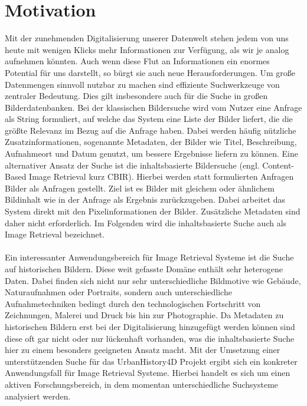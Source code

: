 \section*{Motivation}
Mit der zunehmenden Digitalisierung unserer Datenwelt stehen jedem von uns heute mit wenigen Klicks mehr Informationen zur Verfügung, als wir je analog aufnehmen könnten. Auch wenn diese Flut an Informationen ein enormes Potential für uns darstellt, so bürgt sie auch neue Herausforderungen. Um große Datenmengen sinnvoll nutzbar zu machen sind effiziente Suchwerkzeuge von zentraler Bedeutung. Dies gilt insbesondere auch für die Suche in großen Bilderdatenbanken. Bei der klassischen Bildersuche wird vom Nutzer eine Anfrage als String formuliert, auf welche das System eine Liste der Bilder liefert, die die größte Relevanz im Bezug auf die Anfrage haben. Dabei werden häufig nützliche  Zusatzinformationen, sogenannte Metadaten, der Bilder wie Titel, Beschreibung, Aufnahmeort und Datum genutzt, um bessere Ergebnisse liefern zu können. Eine alternativer Ansatz der Suche ist die inhaltsbasierte Bildersuche (engl. Content-Based Image Retrieval kurz CBIR). Hierbei werden statt formulierten Anfragen Bilder als Anfragen gestellt. Ziel ist es Bilder mit gleichem oder ähnlichem Bildinhalt wie in der Anfrage als Ergebnis zurückzugeben. Dabei arbeitet das System direkt mit den Pixelinformationen der Bilder. Zusätzliche Metadaten sind daher nicht erforderlich. Im Folgenden wird die inhaltsbasierte Suche auch als Image Retrieval bezeichnet.
\\\\
Ein interessanter Anwendungsbereich für Image Retrieval Systeme ist die Suche auf historischen Bildern. Diese weit gefasste Domäne enthält sehr heterogene Daten. Dabei finden sich nicht nur sehr unterschiedliche Bildmotive wie Gebäude, Naturaufnahmen oder Portraits, sondern auch unterschiedliche Aufnahmetechniken bedingt durch den technologischen Fortschritt von Zeichnungen, Malerei und Druck bis hin zur Photographie. Da Metadaten zu historischen Bildern erst bei der Digitalisierung hinzugefügt werden können sind diese oft gar nicht oder nur lückenhaft vorhanden, was die inhaltsbasierte Suche hier zu einem besonders geeigneten Ansatz macht. Mit der Umsetzung einer unterstützenden Suche für das UrbanHistory4D Projekt \cite{urbanhistory4d} ergibt sich ein konkreter Anwendungsfall für Image Retrieval Systeme. Hierbei handelt es sich um einen aktiven Forschungsbereich, in dem momentan unterschiedliche Suchsysteme analysiert werden. 
\\\\
